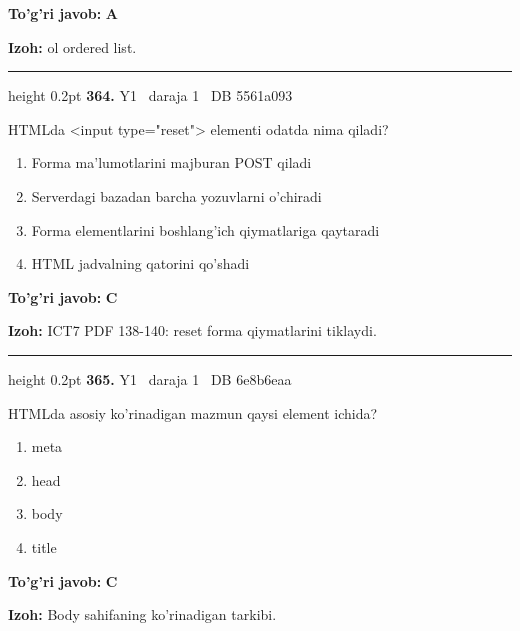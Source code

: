 \documentclass[10pt,a4paper,oneside]{article}
\begin{document}
\begin{tcolorbox}[enhanced,breakable,colback=teal!4,colframe=teal!45!black,boxrule=0.45pt,arc=1.2mm,left=2.8mm,right=2.8mm,top=2mm,bottom=2mm,before skip=2mm,after skip=2mm]
\textbf{\color{teal}To'g'ri javob:} \textbf{A}
\par\smallskip
\textbf{Izoh:} ol ordered list.
\end{tcolorbox}
\vspace{2mm}\hrule height 0.2pt \vspace{4mm}
\hypertarget{q364}{\textbf{\color{ink}364.}}  {\color{muted}\scriptsize Y1 \textbullet\ daraja 1 \textbullet\ DB 5561a093}
\par
HTMLda \textless{}input type="reset"\textgreater{} elementi odatda nima qiladi?
\begin{enumerate}[label=\Alph*),leftmargin=9mm]
\item Forma ma'lumotlarini majburan POST qiladi
\item Serverdagi bazadan barcha yozuvlarni o'chiradi
\item Forma elementlarini boshlang'ich qiymatlariga qaytaradi
\item HTML jadvalning qatorini qo'shadi
\end{enumerate}
\begin{tcolorbox}[enhanced,breakable,colback=teal!4,colframe=teal!45!black,boxrule=0.45pt,arc=1.2mm,left=2.8mm,right=2.8mm,top=2mm,bottom=2mm,before skip=2mm,after skip=2mm]
\textbf{\color{teal}To'g'ri javob:} \textbf{C}
\par\smallskip
\textbf{Izoh:} ICT7 PDF 138-140: reset forma qiymatlarini tiklaydi.
\end{tcolorbox}
\vspace{2mm}\hrule height 0.2pt \vspace{4mm}
\hypertarget{q365}{\textbf{\color{ink}365.}}  {\color{muted}\scriptsize Y1 \textbullet\ daraja 1 \textbullet\ DB 6e8b6eaa}
\par
HTMLda asosiy ko'rinadigan mazmun qaysi element ichida?
\begin{enumerate}[label=\Alph*),leftmargin=9mm]
\item meta
\item head
\item body
\item title
\end{enumerate}
\begin{tcolorbox}[enhanced,breakable,colback=teal!4,colframe=teal!45!black,boxrule=0.45pt,arc=1.2mm,left=2.8mm,right=2.8mm,top=2mm,bottom=2mm,before skip=2mm,after skip=2mm]
\textbf{\color{teal}To'g'ri javob:} \textbf{C}
\par\smallskip
\textbf{Izoh:} Body sahifaning ko'rinadigan tarkibi.
\end{tcolorbox}
\end{document}
